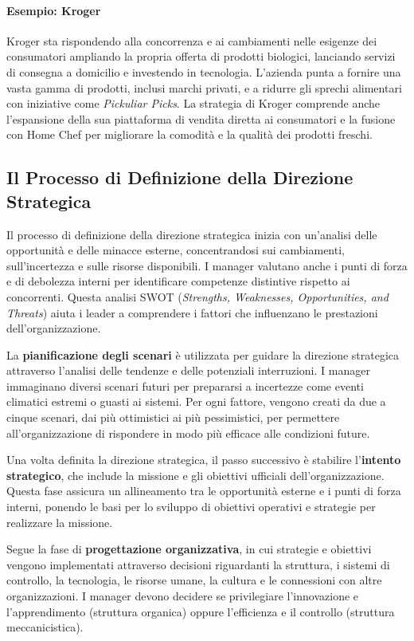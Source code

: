 \documentclass{article}
\begin{document}
\paragraph{Esempio: Kroger}
Kroger sta rispondendo alla concorrenza e ai cambiamenti nelle esigenze dei consumatori ampliando la propria offerta di prodotti biologici, lanciando servizi di consegna a domicilio e investendo in tecnologia. L'azienda punta a fornire una vasta gamma di prodotti, inclusi marchi privati, e a ridurre gli sprechi alimentari con iniziative come \textit{Pickuliar Picks}. La strategia di Kroger comprende anche l'espansione della sua piattaforma di vendita diretta ai consumatori e la fusione con Home Chef per migliorare la comodità e la qualità dei prodotti freschi.  

\subsection{Il Processo di Definizione della Direzione Strategica}

Il processo di definizione della direzione strategica inizia con un'analisi delle opportunità e delle minacce esterne, concentrandosi sui cambiamenti, sull'incertezza e sulle risorse disponibili. I manager valutano anche i punti di forza e di debolezza interni per identificare competenze distintive rispetto ai concorrenti. Questa analisi SWOT (\textit{Strengths, Weaknesses, Opportunities, and Threats}) aiuta i leader a comprendere i fattori che influenzano le prestazioni dell'organizzazione.  

La \textbf{pianificazione degli scenari} è utilizzata per guidare la direzione strategica attraverso l'analisi delle tendenze e delle potenziali interruzioni. I manager immaginano diversi scenari futuri per prepararsi a incertezze come eventi climatici estremi o guasti ai sistemi. Per ogni fattore, vengono creati da due a cinque scenari, dai più ottimistici ai più pessimistici, per permettere all'organizzazione di rispondere in modo più efficace alle condizioni future.  

Una volta definita la direzione strategica, il passo successivo è stabilire l’\textbf{intento strategico}, che include la missione e gli obiettivi ufficiali dell'organizzazione. Questa fase assicura un allineamento tra le opportunità esterne e i punti di forza interni, ponendo le basi per lo sviluppo di obiettivi operativi e strategie per realizzare la missione.  

Segue la fase di \textbf{progettazione organizzativa}, in cui strategie e obiettivi vengono implementati attraverso decisioni riguardanti la struttura, i sistemi di controllo, la tecnologia, le risorse umane, la cultura e le connessioni con altre organizzazioni. I manager devono decidere se privilegiare l’innovazione e l’apprendimento (struttura organica) oppure l’efficienza e il controllo (struttura meccanicistica).  
\end{document}
